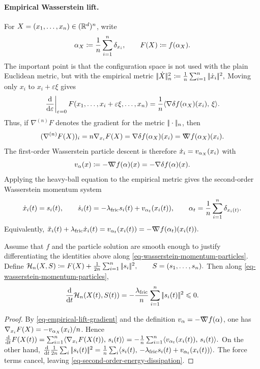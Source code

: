 \paragraph{Empirical Wasserstein lift.}
For $X=(x_1,\ldots,x_n)\in(\mathbb{R}^d)^n$, write
\begin{equation}\label{eq-empirical-momentum-lift}
\alpha_X \coloneqq \frac1n\sum_{i=1}^n \delta_{x_i},
\qquad
F(X) \coloneqq f(\alpha_X).
\end{equation}
The important point is that the configuration space is not used with the plain Euclidean metric, but with the empirical metric
\(|\!| \dot X |\!|_n^2 \coloneqq \frac1n\sum_{i=1}^n|\!| \dot x_i |\!|^2,\)
Moving only $x_i$ to $x_i+\varepsilon \xi$ gives
\[
\left.\frac{\mathrm{d}}{\mathrm{d}\varepsilon}\right|_{\varepsilon=0}
F(x_1,\ldots,x_i+\varepsilon\xi,\ldots,x_n)
=
\frac1n\langle \nabla\delta f(\alpha_X)(x_i),\,\xi\rangle.
\]
Thus, if $\nabla^{(n)}F$ denotes the gradient for the metric $|\!| \cdot |\!|_n$, then
\begin{equation}\label{eq-empirical-lift-gradient}
(\nabla^{(n)}F(X))_i
=
n\nabla_{x_i}F(X)
=
\nabla\delta f(\alpha_X)(x_i)
=
\mathord{\nabla\mkern-9.3mu\nabla} f(\alpha_X)(x_i).
\end{equation}
The first-order Wasserstein particle descent is therefore $\dot x_i=v_{\alpha_X}(x_i)$ with
\begin{equation}\label{eq-momentum-wasserstein-velocity}
v_\alpha(x)\coloneqq -\mathord{\nabla\mkern-9.3mu\nabla} f(\alpha)(x)=-\nabla\delta f(\alpha)(x).
\end{equation}
Applying the heavy-ball equation to the empirical metric gives the second-order Wasserstein momentum system
\begin{equation}\label{eq-wasserstein-momentum-particles}
\dot x_i(t)=s_i(t),
\qquad
\dot s_i(t)=-\lambda_{\rm fric} s_i(t)+v_{\alpha_t}(x_i(t)),
\qquad
\alpha_t=\frac1n\sum_{i=1}^n\delta_{x_i(t)}.
\end{equation}
Equivalently, \(\ddot x_i(t)+\lambda_{\rm fric}\dot x_i(t) = v_{\alpha_t}(x_i(t)) = -\mathord{\nabla\mkern-9.3mu\nabla} f(\alpha_t)(x_i(t)).\)
\begin{prop}\label{prop-second-order-energy-dissipation}
Assume that $f$ and the particle solution are smooth enough to justify differentiating the identities above along \eqref{eq-wasserstein-momentum-particles}. Define
\(\mathcal H_n(X,S) \coloneqq F(X)+\frac1{2n}\sum_{i=1}^n|\!| s_i |\!|^2, \qquad S=(s_1,\ldots,s_n).\)
Then along \eqref{eq-wasserstein-momentum-particles},
\begin{equation}\label{eq-second-order-energy-dissipation}
\frac{\mathrm{d}}{\mathrm{d} t}\mathcal H_n(X(t),S(t))
=
-\frac{\lambda_{\rm fric}}{n}\sum_{i=1}^n|\!| s_i(t) |\!|^2
\leqslant 0.
\end{equation}
\end{prop}
\begin{proof}
By \eqref{eq-empirical-lift-gradient} and the definition $v_\alpha=-\mathord{\nabla\mkern-9.3mu\nabla} f(\alpha)$, one has $\nabla_{x_i}F(X)=-v_{\alpha_X}(x_i)/n$. Hence
\(\frac{\mathrm{d}}{\mathrm{d} t}F(X(t)) = \sum_{i=1}^n \langle \nabla_{x_i}F(X(t)),\,s_i(t)\rangle = -\frac1n\sum_{i=1}^n\langle v_{\alpha_t}(x_i(t)),\,s_i(t)\rangle.\)
On the other hand, \(\frac{\mathrm{d}}{\mathrm{d} t}\frac1{2n}\sum_i|\!| s_i(t) |\!|^2 = \frac1n\sum_i\langle s_i(t),\,-\lambda_{\rm fric} s_i(t)+v_{\alpha_t}(x_i(t))\rangle.\)
The force terms cancel, leaving \eqref{eq-second-order-energy-dissipation}.
\end{proof}
